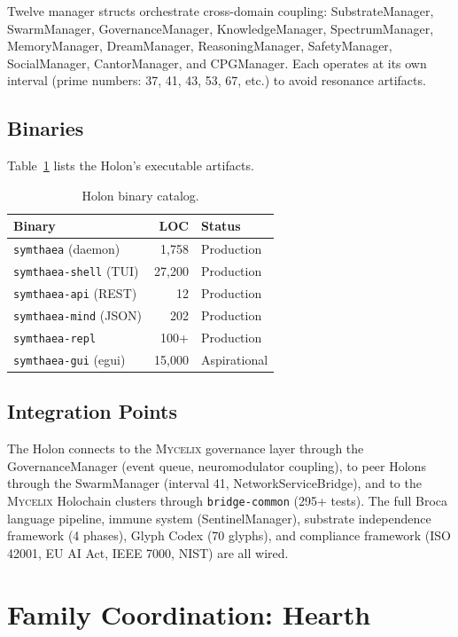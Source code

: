 \documentclass[11pt,twocolumn]{article}
\newcommand{\mycelix}{\textsc{Mycelix}}
\begin{document}
Twelve manager structs orchestrate cross-domain coupling: SubstrateManager, SwarmManager, GovernanceManager, KnowledgeManager, SpectrumManager, MemoryManager, DreamManager, ReasoningManager, SafetyManager, SocialManager, CantorManager, and CPGManager. Each operates at its own interval (prime numbers: 37, 41, 43, 53, 67, etc.) to avoid resonance artifacts.

\subsection{Binaries}

Table~\ref{tab:holon-binaries} lists the Holon's executable artifacts.

\begin{table}[H]
\centering
\caption{Holon binary catalog.}
\label{tab:holon-binaries}
\begin{tabular}{lrl}
\toprule
\textbf{Binary} & \textbf{LOC} & \textbf{Status} \\
\midrule
\texttt{symthaea} (daemon) & 1,758 & Production \\
\texttt{symthaea-shell} (TUI) & 27,200 & Production \\
\texttt{symthaea-api} (REST) & 12 & Production \\
\texttt{symthaea-mind} (JSON) & 202 & Production \\
\texttt{symthaea-repl} & 100+ & Production \\
\texttt{symthaea-gui} (egui) & 15,000 & Aspirational \\
\bottomrule
\end{tabular}
\end{table}

\subsection{Integration Points}

The Holon connects to the \mycelix{} governance layer through the GovernanceManager (event queue, neuromodulator coupling), to peer Holons through the SwarmManager (interval 41, NetworkServiceBridge), and to the \mycelix{} Holochain clusters through \texttt{bridge-common} (295+ tests). The full Broca language pipeline, immune system (SentinelManager), substrate independence framework (4 phases), Glyph Codex (70 glyphs), and compliance framework (ISO 42001, EU AI Act, IEEE 7000, NIST) are all wired.

\section{Family Coordination: Hearth}
\label{sec:hearth}
\end{document}
